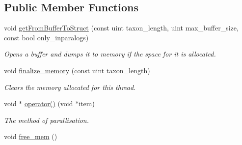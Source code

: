 \subsection*{Public Member Functions}
\begin{DoxyCompactItemize}
\item 
\hypertarget{classpipe__struct_a2e4bd1642de55f4731dc37bafedd4d03}{
void \hyperlink{classpipe__struct_a2e4bd1642de55f4731dc37bafedd4d03}{getFromBufferToStruct} (const uint taxon\_\-length, uint max\_\-buffer\_\-size, const bool only\_\-inparalogs)}
\label{classpipe__struct_a2e4bd1642de55f4731dc37bafedd4d03}

\begin{DoxyCompactList}\small\item\em Opens a buffer and dumps it to memory if the space for it is allocated. \end{DoxyCompactList}\item 
\hypertarget{classpipe__struct_a3671204dcf9fc367a8d3fa257168e8c0}{
void \hyperlink{classpipe__struct_a3671204dcf9fc367a8d3fa257168e8c0}{finalize\_\-memory} (const uint taxon\_\-length)}
\label{classpipe__struct_a3671204dcf9fc367a8d3fa257168e8c0}

\begin{DoxyCompactList}\small\item\em Clears the memory allocated for this thread. \end{DoxyCompactList}\item 
\hypertarget{classpipe__struct_aed3e03bc6bc544e326efac9a07a24025}{
void $\ast$ \hyperlink{classpipe__struct_aed3e03bc6bc544e326efac9a07a24025}{operator()} (void $\ast$item)}
\label{classpipe__struct_aed3e03bc6bc544e326efac9a07a24025}

\begin{DoxyCompactList}\small\item\em The method of parallisation. \end{DoxyCompactList}\item 
\hypertarget{classpipe__struct_ae9dc6e2a83cb63bcb5ef42be0ae3a2ca}{
void \hyperlink{classpipe__struct_ae9dc6e2a83cb63bcb5ef42be0ae3a2ca}{free\_\-mem} ()}
\label{classpipe__struct_ae9dc6e2a83cb63bcb5ef42be0ae3a2ca}


\end{DoxyCompactItemize}
